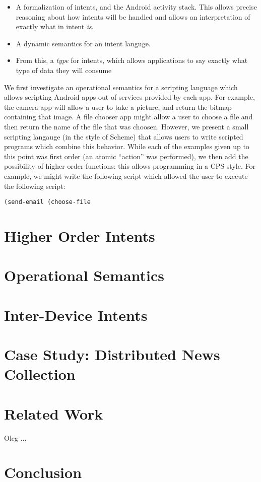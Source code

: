\documentclass{acm_proc_article-sp}
\begin{document}
\begin{itemize}
\item A formalization of intents, and the Android activity stack.
  This allows precise reasoning about how intents will be handled and
  allows an interpretation of exactly what in intent \emph{is}.
\item A dynamic semantics for an intent languge.
\item From this, a \emph{type} for intents, which allows applications
  to say exactly what type of data they will consume 
\end{itemize}

We first investigate an operational semantics for a scripting language
which allows scripting Android apps out of services provided by each
app.  For example, the camera app will allow a user to take a picture,
and return the bitmap containing that image.  A file chooser app might
allow a user to choose a file and then return the name of the file
that was choosen.  However, we present a small scripting langauge (in
the style of Scheme) that allows users to write scripted programs
which combine this behavior.  While each of the examples given up to
this point was first order (an atomic ``action'' was performed), we
then add the possibility of higher order functions: this allows
programming in a CPS style.  For example, we might write the following
script which allowed the user to execute the following script:

\begin{verbatim}
(send-email (choose-file
\end{verbatim}

\section{Higher Order Intents}

\section{Operational Semantics}

\section{Inter-Device Intents}

\section{Case Study: Distributed News Collection}

\section{Related Work}
Oleg \cite{kiselyov:2006} ...

\section{Conclusion}

{}

\end{document}
